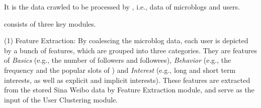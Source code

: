  It is the data crawled to be processed by \sys{}, i.e., data of microblogs and users.

\sys{} consists of three key modules.

	\stab(1)  Feature Extraction: By coalescing the microblog data, each user is depicted by a bunch of features, which are grouped into three categories. They are features of \textit{Basics} (e.g., the number of followers and followees), \textit{Behavior} (e.g., the frequency and the popular slots of \retg{}) and \textit{Interest} (e.g., long and short term interests, as well as explicit and implicit interests). These features are extracted from the stored  Sina Weibo data by Feature Extraction module, and serve as the input of the User Clustering module.
	
